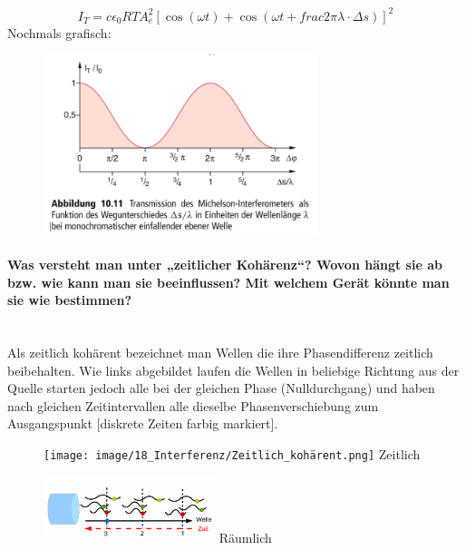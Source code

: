 \documentclass[a4paper, 11pt, parskip=half]{scrartcl}
\newcommand{\myparagraph}[1]{\paragraph{#1}\mbox{}\\}
\begin{document}
\begin{equation}
    I_T = c \epsilon_0 RT A_e^2[\cos(\omega t) + \cos(\omega t + frac{2\pi}{\lambda}\cdot \Delta s)]^2
\end{equation}
Nochmals grafisch:
\begin{figure}[H]
    \centering
    \includegraphics[width=8cm]{image/18_Interferenz/Michelson_Funktion_Wegunterschied.png}
\end{figure}

\myparagraph{Was versteht man unter „zeitlicher Kohärenz“? Wovon hängt sie ab bzw. wie kann man sie
beeinflussen? Mit welchem Gerät könnte man sie wie bestimmen?}

Als \glqq zeitlich kohärent \grqq bezeichnet man Wellen die ihre Phasendifferenz zeitlich beibehalten. Wie links abgebildet laufen die Wellen in beliebige Richtung aus der Quelle
starten jedoch alle bei der gleichen Phase (Nulldurchgang) und haben nach gleichen Zeitintervallen alle dieselbe Phasenverschiebung zum Ausgangspunkt [diskrete Zeiten farbig markiert].
\begin{figure}[H]
    \centering
    \begin{minipage}[b]{0.3\textwidth}
        \centering
        \texttt{[image: image/18\_Interferenz/Zeitlich\_kohärent.png]}
        Zeitlich
    \end{minipage}
    \hspace{2cm}
    \begin{minipage}[b]{0.3\textwidth}
        \centering
        \includegraphics[width=5cm]{image/18_Interferenz/räumliche_kohärenz.png}
        Räumlich
    \end{minipage}
\end{figure}
\end{document}
